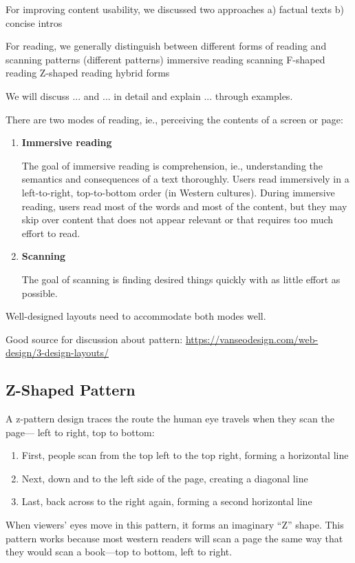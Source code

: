 For improving content usability, we discussed two approaches
a) factual texts
b) concise intros





For reading, we generally distinguish between different forms of reading and scanning patterns (different patterns)
immersive reading
scanning
F-shaped reading
Z-shaped reading
hybrid forms

We will discuss ... and ... in detail and explain ... through examples.

There are two modes of reading, ie., perceiving the contents of a screen or page:
\begin{enumerate}
	\item \textbf{Immersive reading} \par The goal of immersive reading is comprehension, ie., understanding the semantics and consequences of a text thoroughly.
	Users read immersively in a left-to-right, top-to-bottom order (in Western cultures).
	During immersive reading, users read most of the words and most of the content, but they may skip over content that does not appear relevant or that requires too much effort to read.
	
	\item \textbf{Scanning} \par The goal of scanning is finding desired things quickly with as little effort as possible.
\end{enumerate}
Well-designed layouts need to accommodate both modes well. 

Good source for discussion about pattern: \url{https://vanseodesign.com/web-design/3-design-layouts/}

\subsection{Z-Shaped Pattern} %
\label{sub:z_shaped_pattern}

A z-pattern design traces the route the human eye travels when they scan the page— left to right, top to bottom:
\begin{enumerate}
	\item First, people scan from the top left to the top right, forming a horizontal line
	\item Next, down and to the left side of the page, creating a diagonal line
	\item Last, back across to the right again, forming a second horizontal line
\end{enumerate}
When viewers’ eyes move in this pattern, it forms an imaginary ``Z'' shape.
This pattern works because most western readers will scan a page the same way that they would scan a book---top to bottom, left to right.

